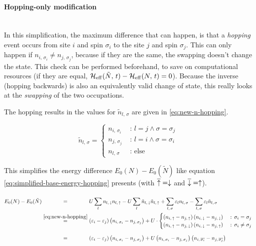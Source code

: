 \paragraph*{Hopping-only modification} \makebox{}\\

In this simplification, the maximum difference that can happen, is that a \emph{hopping} event occurs from site $i$ and spin $\sigma_i$ to the site $j$ and spin $\sigma_j$. 
This can only happen if $n_{i,\,\sigma_i} \neq n_{j,\,\sigma_j}$, because if they are the same, the swapping doesn't change the state. 
This check can be performed beforehand, to save on computational resources (if they are equal, $\HeffOft[\tilde{N}]-\HeffOft[N] = 0$).
Because the inverse (hopping backwards) is also an equivalently valid change of state, this really looks at the \emph{swapping} of the two occupations.

The hopping results in the values for $\tilde{n}_{l,\,\sigma}$ are given in \autoref{eq:new-n-hopping}.

\begin{equation}
    \label{eq:new-n-hopping}
    \tilde{n}_{l,\,\sigma} = \begin{cases}
        n_{i,\,\sigma_i}&\text{ : } l = j \land \sigma = \sigma_j   \\
        n_{j,\,\sigma_j}&\text{ : } l = i \land \sigma = \sigma_i   \\
        n_{l,\,\sigma} &\text{ : else}
    \end{cases}
\end{equation}

This simplifies the energy difference $E_0(N)-E_0(\tilde{N})$ like equation \autoref{eq:simplified-base-energy-hopping} presents (with $\overline{\up} = \down$ and  $\overline{\down} = \up$).

\begin{equation}
    \label{eq:simplified-base-energy-hopping}
    \begin{split}
        E_0(N)-E_0(\tilde{N}) 
        &\stackrel{\phantom{\ref{eq:new-n-hopping}}}{=} U\lsum n_{l,\,\down}n_{l,\,\up}-U\lsum \tilde{n}_{l,\,\down}\tilde{n}_{l,\,\up} 
        + \lsum[l,\,\sigma] \epsl n_{l,\,\sigma} - \lsum[l,\,\sigma] \epsl \tilde{n}_{l,\,\sigma}\\
        &\stackrel{\ref{eq:new-n-hopping}}{=} \left(\epsl[i]-\epsl[j]\right)\left(n_{i,\,\sigma_i} - n_{j,\,\sigma_j}\right) +
        U\cdot \begin{cases}
            \left(n_{i,\,\up}-n_{j,\,\up}\right) \left(n_{i,\,\down}-n_{j,\,\down}\right) &\text{ : } \sigma_i = \sigma_j   \\
            \left(n_{i,\,\up}-n_{j,\,\down}\right) \left(n_{i,\,\down}-n_{j,\,\up}\right) &\text{ : } \sigma_i \neq \sigma_j
        \end{cases}\\
        &\stackrel{\phantom{\ref{eq:new-n-hopping}}}{=} \left(\epsl[i]-\epsl[j]\right)\left(n_{i,\,\sigma_i} - n_{j,\,\sigma_j}\right) +
        U \left(n_{i,\,\sigma_i}-n_{j,\,\sigma_j}\right) \left(n_{i,\,\overline{\sigma_i}}-n_{j,\,\overline{\sigma_j}}\right)
    \end{split}
\end{equation}

